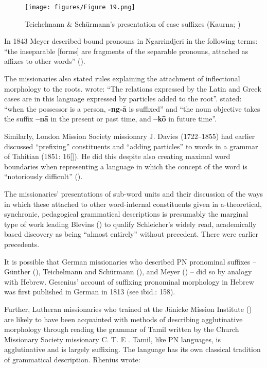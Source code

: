 \begin{figure}
\texttt{[image: figures/Figure 19.png]}
\caption{Teichelmann \& Schürmann’s presentation of case suffixes (Kaurna; \citealt[5]{teichelmann_outlines_1840})}
\label{fig:2:19}
\end{figure} 

In 1843 Meyer described bound pronouns in Ngarrindjeri in the following terms: “the inseparable [forms] are fragments of the separable pronouns, attached as affixes to other words” (\citeyear[22]{meyer_vocabulary_1843}). 

The missionaries also stated rules explaining the attachment of inflectional morphology to the roots. \citet[11]{meyer_vocabulary_1843} wrote: “The relations expressed by the Latin and Greek cases are in this language expressed by particles added to the root”. \citet[8]{roth_ethnological_1897} stated: “when the possessor is a person, \textbf{-ng-ā} is suffixed” and “the noun objective takes the suffix \textbf{–nā} in the present or past time, and \textbf{–kō} in future time”. 

Similarly, London Mission Society missionary J. Davies (1722--1855) had earlier discussed “prefixing” constituents and “adding particles” to words in a grammar of Tahitian (1851: 16[\citeyear{davies_grammar_1823}]). He did this despite also creating maximal word boundaries when representing a language in which the concept of the word is “notoriously difficult” (\citealt[108]{hovdhaugen_beginning_1993}).

The missionaries' presentations of sub-word units and their discussion of the ways in which these attached to other word-internal constituents given in a-theoretical, synchronic, pedagogical grammatical descriptions is presumably the marginal type of work leading Blevins (\citeyear[383]{blevins_word-based_2013}) to qualify Schleicher’s widely read, academically based discovery as being “almost entirely” without precedent. There were earlier precedents. 

\largerpage
It is possible that German missionaries who described PN pronominal suffixes – Günther (), Teichelmann and Schürmann (), and Meyer () – did so by analogy with Hebrew. Gesenius' account of suffixing pronominal morphology in Hebrew was first published in German in 1813 (see ibid.: 158).

\largerpage
Further, Lutheran missionaries who trained at the Jänicke Mission Institute () are likely to have been acquainted with methods of describing agglutinative morphology through reading the grammar of Tamil written by the Church Missionary Society missionary C. T. E \citet{rhenius_grammar_1836}. Tamil, like PN languages, is agglutinative and is largely suffixing. The language has its own classical tradition of grammatical description. Rhenius wrote:

